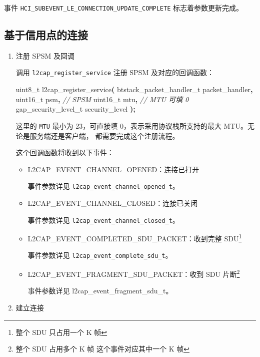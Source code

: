 \documentclass[
  12pt,
]{book}
\newenvironment{Shaded}{\begin{snugshade}}{\end{snugshade}}
\newcommand{\CommentTok}[1]{\textcolor[rgb]{0.56,0.35,0.01}{\textit{#1}}}
\newcommand{\DataTypeTok}[1]{\textcolor[rgb]{0.13,0.29,0.53}{#1}}
\newcommand{\NormalTok}[1]{#1}
\newcommand{\OperatorTok}[1]{\textcolor[rgb]{0.81,0.36,0.00}{\textbf{#1}}}
\begin{document}
事件 \texttt{HCI\_SUBEVENT\_LE\_CONNECTION\_UPDATE\_COMPLETE} 标志着参数更新完成。

\hypertarget{ux57faux4e8eux4fe1ux7528ux70b9ux7684ux8fdeux63a5}{%
\subsection{基于信用点的连接}\label{ux57faux4e8eux4fe1ux7528ux70b9ux7684ux8fdeux63a5}}

\begin{enumerate}
\def\labelenumi{\arabic{enumi}.}
\item
  注册 SPSM 及回调

  调用 \texttt{l2cap\_register\_service} 注册 SPSM 及对应的回调函数：

\begin{Shaded}
\begin{Highlighting}[]
\DataTypeTok{uint8\_t}\NormalTok{ l2cap\_register\_service}\OperatorTok{(}
\NormalTok{  btstack\_packet\_handler\_t packet\_handler}\OperatorTok{,}
  \DataTypeTok{uint16\_t}\NormalTok{ psm}\OperatorTok{,}  \CommentTok{// SPSM}
  \DataTypeTok{uint16\_t}\NormalTok{ mtu}\OperatorTok{,}  \CommentTok{// MTU 可填 0}
\NormalTok{  gap\_security\_level\_t security\_level}
  \OperatorTok{);}
\end{Highlighting}
\end{Shaded}

  这里的 \texttt{MTU} 最小为 23，可直接填 0，表示采用协议栈所支持的最大 MTU。无论是服务端还是客户端，
  都需要完成这个注册流程。

  这个回调函数将收到以下事件：

  \begin{itemize}
  \item
    L2CAP\_EVENT\_CHANNEL\_OPENED：连接已打开

    事件参数详见 \texttt{l2cap\_event\_channel\_opened\_t}。
  \item
    L2CAP\_EVENT\_CHANNEL\_CLOSED：连接已关闭

    事件参数详见 \texttt{l2cap\_event\_channel\_closed\_t}。
  \item
    L2CAP\_EVENT\_COMPLETED\_SDU\_PACKET：收到完整 SDU\footnote{整个 SDU 只占用一个 K 帧}

    事件参数详见 \texttt{l2cap\_event\_complete\_sdu\_t}。
  \item
    L2CAP\_EVENT\_FRAGMENT\_SDU\_PACKET：收到 SDU 片断\footnote{整个 SDU 占用多个 K 帧
      这个事件对应其中一个 K 帧}

    事件参数详见 l2cap\_event\_fragment\_sdu\_t。
  \end{itemize}
\item
  建立连接


\end{enumerate}
\end{document}

